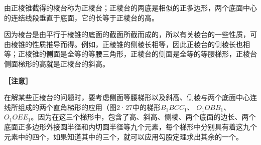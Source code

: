 由正棱锥截得的棱台称为正棱台；正棱台的两底是相似的正多边形，两个底面中心的连结线段垂直于底面，它的长等于正棱台的高。

因为棱台是由平行于棱锥的底面的截面所截而成的，所以有关棱台的一些性质，可由棱锥的性质推导而得。例如，正棱锥的侧棱长相等，因此正棱台的侧棱长也相等；正棱锥的侧面是全等的等腰三角形，正棱台的侧面是全等的等腰梯形，正棱台侧面梯形的高就是正棱台的斜高。

\textbf{［注意］}

在解某些正棱台的问题时，要考虑侧面等腰梯形以及斜高、侧棱与两个底面中心连线所组成的两个直角梯形的应用（图2·27中的梯形\(B_{1}BCC_{1}\)、
\(O_{1}OBB_{1}\)、
\(O_{1}OEE_{1}\)。因为在这三个梯形中，包含了高、斜高、侧棱、两个底面的边长、两个底面正多边形外接圆半径和内切圆半径等九个元素，每个梯形中分别具有着这九个元素中的四个，如果知道其中的三个，就可以应用勾股定理求出其余的一个。

